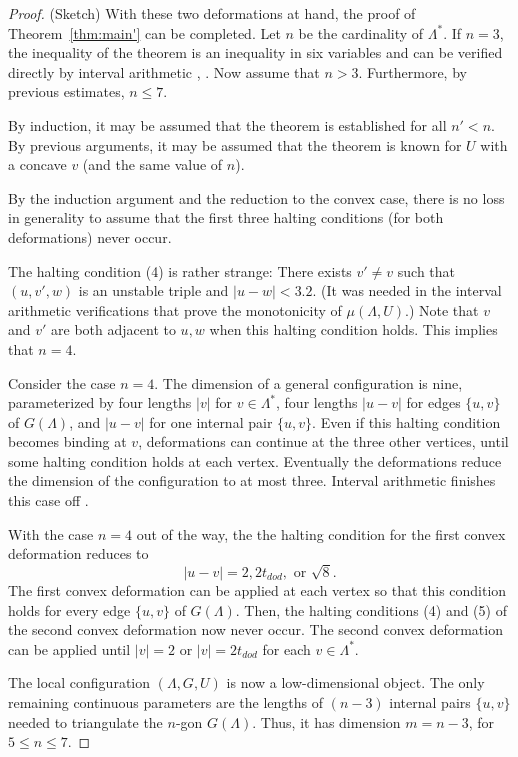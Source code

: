 \documentclass{article} %
\begin{document}
\begin{proof} (Sketch)
With these two deformations at hand, the proof
of Theorem~\ref{thm:main'} can be completed.  Let $n$ be
the cardinality of $\Lambda^*$.
If $n=3$, the inequality of the theorem is an inequality
in six variables and can be verified directly by interval
arithmetic \cite{code}, \cite[\S7.4.1]{arx}.  Now assume
that $n>3$.  Furthermore, by previous estimates, $n\le 7$.


By induction, it may be assumed that
the theorem is established for all $n'<n$.  By previous arguments,
it may be assumed that the theorem is known for $U$ with a concave
$v$ (and the same value of $n$).

By the induction argument and the reduction to the convex case,
there is no loss in generality to assume that the first three
halting conditions (for both deformations) never occur.  

The  halting condition (4) is rather strange:
There exists $v'\ne v$ such that 
$(u,v',w)$ is an unstable triple and $|u-w|<3.2$.
(It was needed in the interval arithmetic verifications
that prove the monotonicity of $\mu(\Lambda,U)$.)  Note
that $v$ and $v'$ are both adjacent to $u,w$ when this
halting condition holds.  This implies that $n=4$.  

Consider the case $n=4$.  The dimension of a general configuration
is nine, parameterized by four lengths $|v|$ for $v\in\Lambda^*$,
four lengths $|u-v|$ for edges $\{u,v\}$ of $G(\Lambda)$, and $|u-v|$
for one internal pair $\{u,v\}$.
Even
if this halting condition becomes binding at $v$, deformations
can continue at the three other vertices, until some halting
condition holds at each vertex.  Eventually the deformations
reduce the dimension of the configuration to at most three.
Interval arithmetic finishes this case off \cite[\S7.4.2]{arx}.

With the case $n=4$ out of the way, the
the halting condition for the first convex deformation
reduces to
  $$
  |u-v| = 2, 2t_{dod}, \text{ or } \sqrt8.
  $$
The first convex deformation can be applied at each vertex 
so that this condition holds for every edge $\{u,v\}$ of $G(\Lambda)$.
Then, the halting conditions (4) and (5) of the second convex
deformation now never occur.  The second convex deformation can
be applied until $|v|=2$ or $|v|=2t_{dod}$ for each $v\in\Lambda^*$.

The local configuration $(\Lambda,G,U)$ is now a low-dimensional
object.  The only remaining continuous parameters are the lengths of
$(n-3)$ internal pairs $\{u,v\}$ needed to triangulate the
$n$-gon $G(\Lambda)$.  Thus, it has dimension $m=n-3$,
for $5\le n\le 7$.


\end{proof}
\end{document}
